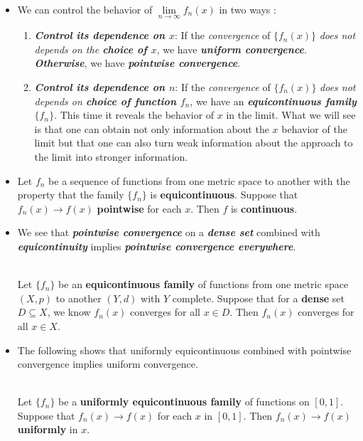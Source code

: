 \documentclass[11pt]{article}
\begin{document}
\begin{itemize}
\item \begin{remark}
We can control the behavior of $\lim\limits_{n\rightarrow \infty}f_n(x)$ in two ways \citep{reed1980methods}:
\begin{enumerate}
\item \emph{\textbf{Control its dependence on $x$}}: If the \emph{convergence} of $\{f_n(x)\}$ \emph{does not depends on the \textbf{choice of $x$}}, we have \emph{\textbf{uniform convergence}}. \emph{\textbf{Otherwise}}, we have \emph{\textbf{pointwise convergence}}.
\item  \emph{\textbf{Control its dependence on $n$}}: If the \emph{convergence} of $\{f_n(x)\}$ \emph{does not depends on \textbf{choice of function $f_n$}}, we have an \emph{\textbf{equicontinuous family $\{f_n\}$}}. This time it reveals the behavior of $x$ in the limit.  What we will see is that one can obtain not only information about the $x$ behavior of the limit but that one can also turn weak information about the approach to the limit into stronger information.
\end{enumerate}
\end{remark}

\item \begin{proposition}
Let $f_n$ be a sequence of functions from one metric space to another with the property that the family $\{f_n\}$ is \textbf{equicontinuous}. Suppose
that $f_n(x) \rightarrow f(x)$ \textbf{pointwise} for each $x$. Then $f$ is \textbf{continuous}.
\end{proposition}

\item We see that \emph{\textbf{pointwise convergence}} on a \emph{\textbf{dense set}} combined with \emph{\textbf{equicontinuity}} implies \emph{\textbf{pointwise convergence everywhere}}.
\begin{proposition} \citep{reed1980methods}\\
Let $\{f_n\}$ be an \textbf{equicontinuous family} of functions from one metric space $(X, p)$ to another $(Y, d)$ with $Y$ complete. Suppose that for a \textbf{dense} set $D \subseteq X$, we know $f_{n}(x)$ converges for all $x \in D$. Then $f_{n}(x)$ converges for all $x \in X$.
\end{proposition}

\item The following shows that uniformly equicontinuous combined with pointwise convergence implies uniform convergence.
\begin{proposition} \citep{reed1980methods}\\
Let $\{f_n\}$ be a \textbf{uniformly equicontinuous family} of functions on $[0, 1]$. Suppose that $f_n(x) \rightarrow f(x)$ for each $x$ in $[0, 1]$. Then $f_n(x) \rightarrow f(x)$  \textbf{uniformly} in $x$.
\end{proposition}


\end{itemize}
\end{document}
